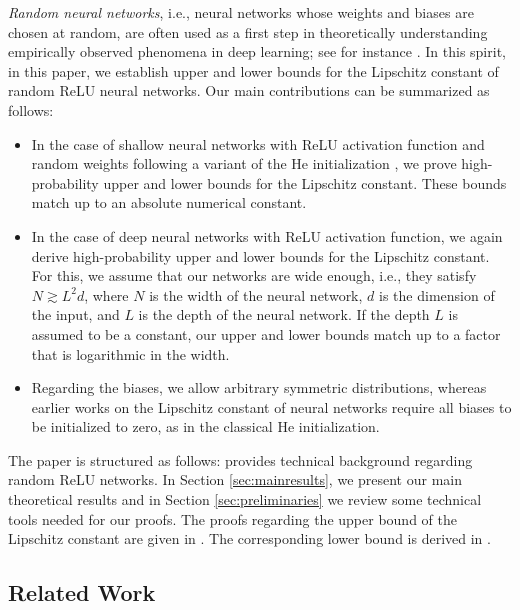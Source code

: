 \emph{Random neural networks}, i.e., neural networks whose weights and biases are chosen at random,
are often used as a first step in theoretically understanding empirically observed phenomena in deep learning;
see for instance \cite{dirksen2022separation,bartlett2021adversarial,daniely2020most}.
In this spirit, in this paper, we establish upper and lower bounds for the Lipschitz constant of random ReLU neural networks.
Our main contributions can be summarized as follows:
\begin{itemize}
  \item In the case of shallow neural networks with ReLU activation function
        and random weights following a variant of the He initialization \cite{he2015delving},
        we prove high-probability upper and lower bounds for the Lipschitz constant.
        These bounds match up to an absolute numerical constant.

  \item In the case of deep neural networks with ReLU activation function,
        we again derive high-probability upper and lower bounds for the Lipschitz constant.
        For this, we assume that our networks are wide enough, i.e.,
        they satisfy $N\gtrsim L^2 d$, where $N$ is the width of the neural network,
        $d$ is the dimension of the input, and $L$ is the depth of the neural network.
        If the depth $L$ is assumed to be a constant, our upper and lower bounds match up to a factor that is logarithmic in the width.
\item Regarding the biases, we allow arbitrary symmetric distributions, whereas earlier works on the Lipschitz constant of neural networks \cite{nguyen2021tight,buchanan2021deep}
require all biases to be initialized to zero, as in the classical He initialization.
\end{itemize}




The paper is structured as follows:
 provides technical background regarding random ReLU networks.
In Section \ref{sec:mainresults}, we present our main theoretical results
and in Section \ref{sec:preliminaries} we review some technical tools needed for our proofs.
The proofs regarding the upper bound of the Lipschitz constant are given in . 
The corresponding lower bound is derived in .


\subsection{Related Work}\label{subsec:relatedwork}

